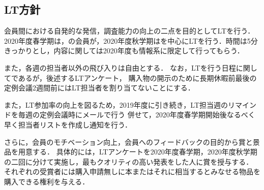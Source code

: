 \subsection*{LT方針}

会員間における自発的な発信，調査能力の向上の二点を目的としてLTを行う．
2020年度春学期は\secondGrade{}，\thirdGrade{}の会員が，2020年度秋学期は\firstGrade{}を中心にLTを行う．時間は5分きっかりとし，内容に関しては2020年度も情報系に限定して行ってもらう．

また，各週の担当者以外の飛び入りは自由とする．
なお，LTを行う日程に関してであるが，後述するLTアンケート，
購入物の開示のために長期休暇前最後の定例会議2週間前にはLT担当者を割り当てないことにする．

また，LT参加率の向上を図るため，2019年度に引き続き，LT担当週のリマインドを毎週の定例会議時にメールで行う
併せて，2020年度春学期開始後なるべく早く担当者リストを作成し通知を行う．

さらに，会員のモチベーション向上，会員へのフィードバックの目的から賞と景品を用意する．
具体的には，LTアンケートを2020年度春学期，2020年度秋学期の二回に分けて実施し，最もクオリティの高い発表をした人に賞を授与する．
それぞれの受賞者には購入申請無しに本またはそれに相当するとみなせる物品を購入できる権利を与える．
